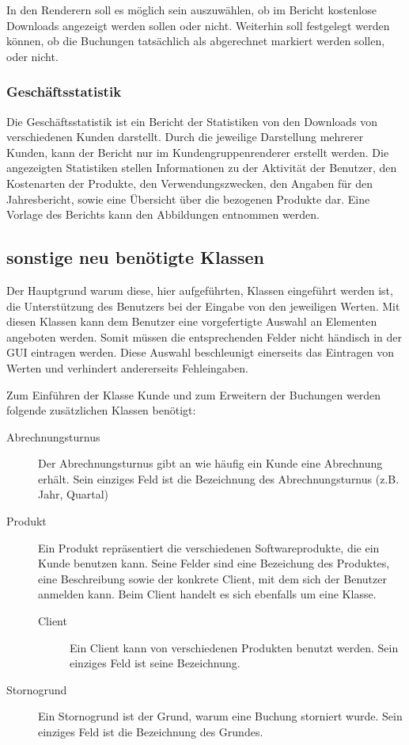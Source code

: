 In den Renderern soll es möglich sein auszuwählen, ob im Bericht kostenlose Downloads angezeigt werden sollen oder nicht. Weiterhin soll festgelegt werden können, ob die Buchungen tatsächlich als abgerechnet markiert werden sollen, oder nicht.

\subsubsection{Geschäftsstatistik}
Die Geschäftsstatistik ist ein Bericht der Statistiken von den Downloads von verschiedenen Kunden darstellt.
Durch die jeweilige Darstellung mehrerer Kunden, kann der Bericht nur im Kundengruppenrenderer erstellt werden.
Die angezeigten Statistiken stellen Informationen zu der Aktivität der Benutzer, den Kostenarten der Produkte, den Verwendungszwecken, den Angaben für den Jahresbericht, sowie eine Übersicht über die bezogenen Produkte dar.
Eine Vorlage des Berichts kann den Abbildungen  entnommen werden.
 
\subsection{sonstige neu benötigte Klassen} \label{subsec:neue_klassen}
Der Hauptgrund warum diese, hier aufgeführten, Klassen eingeführt werden ist, die Unterstützung des Benutzers bei der Eingabe von den jeweiligen Werten.
Mit diesen Klassen kann dem Benutzer eine vorgefertigte Auswahl an Elementen angeboten werden.
Somit müssen die entsprechenden Felder nicht händisch in der GUI eintragen werden.
Diese Auswahl beschleunigt einerseits das Eintragen von Werten und verhindert andererseits Fehleingaben. 

Zum Einführen der Klasse Kunde und zum Erweitern der Buchungen werden folgende zusätzlichen Klassen benötigt:
\begin{description}
\item[Abrechnungsturnus] Der Abrechnungsturnus gibt an wie häufig ein Kunde eine Abrechnung erhält. Sein einziges Feld ist die Bezeichnung des Abrechnungsturnus (z.B. Jahr, Quartal)
\item[Produkt] Ein Produkt repräsentiert die verschiedenen Softwareprodukte, die ein Kunde benutzen kann. Seine Felder sind eine Bezeichung des Produktes, eine Beschreibung sowie der konkrete Client, mit dem sich der Benutzer anmelden kann. Beim Client handelt es sich ebenfalls um eine Klasse.
\begin{description}
\item[Client] Ein Client kann von verschiedenen Produkten benutzt werden. Sein einziges Feld ist seine Bezeichnung.
\end{description}
\item[Stornogrund] Ein Stornogrund ist der Grund, warum eine Buchung storniert wurde. Sein einziges Feld ist die Bezeichnung des Grundes.
\end{description}

